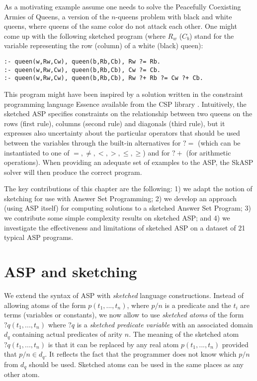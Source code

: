 As a motivating example assume 
one needs to solve %
the Peacefully Coexisting Armies of Queens, a version of the $n$-queens problem with black and white queens, where queens of the same color do not attack each other. 
One might come up with the following sketched program (where 
$R_w$ ($C_b$) stand for the variable representing the row (column) of a white (black) queen): 
\begin{lstlisting}[caption=Peacefully Coexisting Armies of Queens,label=lst:queens,basicstyle=\small\ttfamily]
:- queen(w,Rw,Cw), queen(b,Rb,Cb), Rw ?= Rb.
:- queen(w,Rw,Cw), queen(b,Rb,Cb), Cw ?= Cb.
:- queen(w,Rw,Cw), queen(b,Rb,Cb), Rw ?+ Rb ?= Cw ?+ Cb.
\end{lstlisting}
This program might have been inspired by a solution written in the constraint programming language Essence available from the CSP library \parencite{csplib:prob110}.  
Intuitively, the sketched ASP specifies constraints on the relationship between two queens on the rows (first rule), columns (second rule) and diagonals (third rule), %
but it expresses also uncertainty about the particular operators that should be used between the variables 
through the built-in alternatives for ${?}{=}$  (which can be instantiated to one of $=,\neq,<,>,\leq,\geq$) and for ${?}+$ (for arithmetic operations). 
When providing an adequate set of examples to the ASP, the SkASP solver will then produce the correct program.



The key contributions of this chapter are the following: 1) we adapt the notion of sketching for use with Answer Set Programming;
2) we develop an approach (using ASP itself) for computing solutions to a sketched Answer Set Program;
3) we contribute some simple complexity results on sketched ASP; 
and 4) we investigate the effectiveness and limitations of sketched ASP on a dataset of 21 typical ASP programs. 




\section{ASP and sketching }\label{sec:formal}
We extend the syntax of ASP with \textit{sketched} language constructions. 
Instead of allowing atoms of the form $p(t_1, ...,t_n)$, where $p/n$ is a predicate
and the $t_i$ are terms (variables or constants), we now allow to use
{\em sketched atoms} of the form $?q(t_1, ...,t_n)$ where $?q$ is a {\em sketched predicate variable}
with an associated domain $d_q$ containing actual predicates of arity $n$. 
The meaning of the sketched atom $?q(t_1, ... ,t_n)$ is that it can be replaced
by any real atom $p(t_1, ...,t_n)$ provided that $p/n \in d_q$.
It reflects the fact that the programmer does not know which $p/n$ from $ d_q$ should be used. 
Sketched atoms can be used in the same places as any other atom. 

